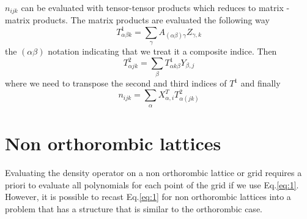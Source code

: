 \documentclass[prb]{revtex4}
\begin{document}
$n_{ijk}$ can be evaluated with tensor-tensor products which reduces to matrix -
matrix products. The matrix products are evaluated the following way
\begin{equation}
  T^1_{\alpha\beta k} = \sum_{\gamma} A_{(\alpha\beta)\gamma} Z_{\gamma, k}
\end{equation}
the $(\alpha\beta)$ notation indicating that we treat it a composite indice. Then
\begin{equation}
  T^2_{\alpha j k} = \sum_{\beta} T^1_{\alpha k \beta} Y_{\beta, j}
\end{equation}
where we need to transpose the second and third indices of $T^1$ and finally
\begin{equation}
  n_{ijk} = \sum_{\alpha} X_{\alpha, i} ^T T^2_{\alpha (j k)}
\end{equation}

\section{Non orthorombic lattices}
Evaluating the density operator on a non orthorombic lattice or grid requires a
priori to evaluate all polynomials for each point of the grid if we use
Eq.\ref{eq:1}. However, it is possible to recast Eq.\ref{eq:1} for non
orthorombic lattices into a problem that has a structure that is similar to the
orthorombic case.
\end{document}
